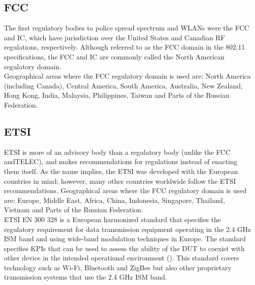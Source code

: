 \subsection{\acf{FCC}}
The first regulatory bodies to police spread spectrum and \acsp{WLAN} were the \acf{FCC} and  \acf{IC}, which have jurisdiction over the United States and Canadian \acs{RF} regulations, respectively. Although referred to as the \acs{FCC} domain in the 802.11 specifications, the \acs{FCC} and \acs{IC} are commonly called the North American regulatory domain. \\

Geographical areas where the \acs{FCC} regulatory domain is used are: North America (including Canada), Central America, South America, Australia, New Zealand, Hong Kong, India, Malaysia, Philippines, Taiwan and Parts of the Russian Federation.

\subsection{\acf{ETSI}}
\acs{ETSI} is more of an advisory body than a regulatory body (unlike the \acs{FCC} and\acs{TELEC}), and makes recommendations for regulations instead of enacting them itself. As the name implies, the \acs{ETSI} was developed with the European countries in mind; however, many other countries worldwide follow the \acs{ETSI} recommendations. Geographical areas where the \acs{FCC} regulatory domain is used are: Europe, Middle East, Africa, China, Indonesia, Singapore, Thailand, Vietnam and Parts of the Russian Federation. \\

\acs{ETSI} EN 300 328 is a European harmonized standard that specifies the regulatory requirement for data transmission equipment operating in the 2.4 GHz \acs{ISM} band and using wide-band modulation techniques in Europe. The standard specifies \acfp{KPI} that can be used to assess the ability of the \acs{DUT} to coexist with other device in the intended operational environment (\cite{7927764}). This standard covers technology such as Wi-Fi\texttrademark{}, Bluetooth\textregistered{} and ZigBee but also other proprietary transmission systems that use the 2.4 GHz \acs{ISM} band.  \\

